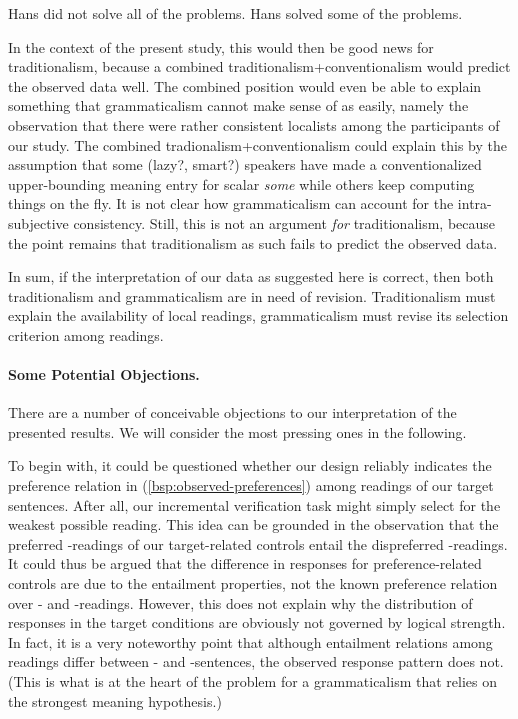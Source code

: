 \documentclass[fleqn,reqno,10pt,draft]{article}
\newcommand{\as}{\acro{as}}
\renewcommand{\es}{\acro{es}}
\newcommand{\lc}{\acro{lc}}
\newcommand{\ec}{\acro{ec}}
\begin{document}
\begin{exe}
  \ex \label{bsp:indirect-SI}
    \begin{xlist}
      \ex \label{bsp:indirect-SI-Target} Hans did not solve all of the problems.
      \ex \label{bsp:indirect-SI-Inference} Hans solved some of the problems.
    \end{xlist}
\end{exe}

\noindent In the context of the present study, this would then be good
news for traditionalism, because a combined
traditionalism+conventionalism would predict the observed data
well. The combined position would even be able to explain something
that grammaticalism cannot make sense of as easily, namely the
observation that there were rather consistent localists among the
participants of our study. The combined tradionalism+conventionalism
could explain this by the assumption that some (lazy?, smart?)
speakers have made a conventionalized upper-bounding meaning entry for
scalar \emph{some} while others keep computing things on the fly. It
is not clear how grammaticalism can account for the intra-subjective
consistency. Still, this is not an argument \emph{for} traditionalism,
because the point remains that traditionalism as such fails to predict
the observed data.
  

In sum, if the interpretation of our data as suggested here is
correct, then both traditionalism and grammaticalism are in need of
revision. Traditionalism must explain the availability of local
readings, grammaticalism must revise its selection criterion among
readings.

\paragraph{Some Potential Objections.} There are a number of
conceivable objections to our interpretation of the presented
results. We will consider the most pressing ones in the following.

To begin with, it could be questioned whether our design reliably
indicates the preference relation in (\ref{bsp:observed-preferences})
among readings of our target sentences. After all, our incremental
verification task might simply select for the weakest possible
reading. This idea can be grounded in the observation that the
preferred \lc-readings of our target-related controls entail the
dispreferred \ec-readings. It could thus be argued that the difference
in responses for preference-related controls are due to the entailment
properties, not the known preference relation over \lc- and
\ec-readings. However, this does not explain why the distribution of
responses in the target conditions are obviously not governed by
logical strength. In fact, it is a very noteworthy point that although
entailment relations among readings differ between \as- and
\es-sentences, the observed response pattern does not. (This is what
is at the heart of the problem for a grammaticalism that relies on the
strongest meaning hypothesis.)
\end{document}
